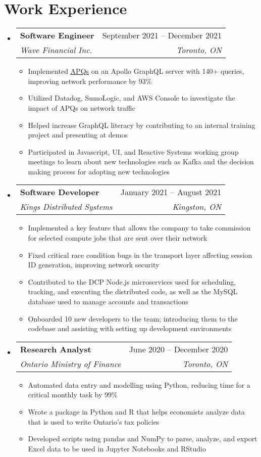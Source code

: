 \documentclass[letterpaper,11pt]{article}
\makeatletter
\newcommand{\resumeItem}[1]{
  \item\small{
    {#1 \vspace{-2pt}}
  }
}
\newcommand{\resumeSubheading}[4]{
  \vspace{-2pt}\item
    \begin{tabular*}{0.97\textwidth}[t]{l@{\extracolsep{\fill}}r}
      \textbf{#1} & #2 \\
      \textit{\small#3} & \textit{\small #4} \\
    \end{tabular*}\vspace{-7pt}
}
\newcommand{\resumeSubHeadingListStart}{\begin{itemize}[leftmargin=0.15in, label={}]}
\newcommand{\resumeSubHeadingListEnd}{\end{itemize}}
\newcommand{\resumeItemListStart}{\begin{itemize}}
\newcommand{\resumeItemListEnd}{\end{itemize}\vspace{-5pt}}
\makeatother
\begin{document}
\section{Work Experience}
  \resumeSubHeadingListStart
    \resumeSubheading
      {Software Engineer}{September 2021 -- December 2021}
      {Wave Financial Inc.}{Toronto, ON}
      \resumeItemListStart 
        \resumeItem{Implemented \href{https://www.apollographql.com/docs/apollo-server/performance/apq/}{\underline{APQs}} on an Apollo GraphQL server with 140+ queries, improving network performance by 93\%}
        \resumeItem{Utilized Datadog, SumoLogic, and AWS Console to investigate the impact of APQs on network traffic}
        \resumeItem{Helped increase GraphQL literacy by contributing to an internal training project and presenting at demos}
        \resumeItem{Participated in Javascript, UI, and Reactive Systems working group meetings to learn about new technologies such as Kafka and the decision making process for adopting new technologies}
      \resumeItemListEnd
    
    \resumeSubheading
      {Software Developer}{January 2021 -- August 2021}
      {Kings Distributed Systems}{Kingston, ON}
      \resumeItemListStart
        \resumeItem{Implemented a key feature that allows the company to take commission for selected compute jobs that are sent over their network}
        \resumeItem{Fixed critical race condition bugs in the transport layer affecting session ID generation, improving network security}
        \resumeItem{Contributed to the DCP Node.js microservices used for scheduling, tracking, and executing the distributed code, as well as the MySQL database used to manage accounts and transactions}
        \resumeItem{Onboarded 10 new developers to the team; introducing them to the codebase and assisting with setting up development environments}
      \resumeItemListEnd

    \resumeSubheading
      {Research Analyst}{June 2020 -- December 2020}
      {Ontario Ministry of Finance}{Toronto, ON}
      \resumeItemListStart
        \resumeItem{Automated data entry and modelling using Python, reducing time for a critical monthly task by 99\%}
        \resumeItem{Wrote a package in Python and R that helps economists analyze data that is used to write Ontario's tax policies}
        \resumeItem{Developed scripts using pandas and NumPy to parse, analyze, and export Excel data to be used in Jupyter Notebooks and RStudio}
      \resumeItemListEnd
  \resumeSubHeadingListEnd
\end{document}
